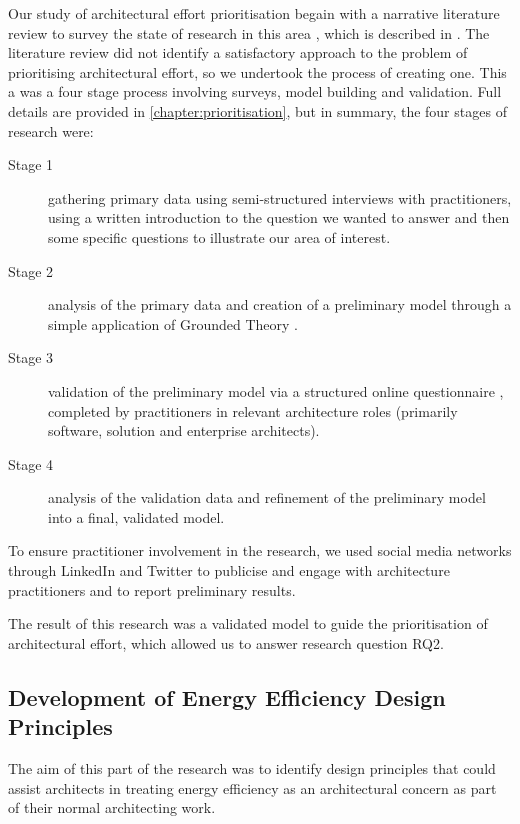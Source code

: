 Our study of architectural effort prioritisation begain with a narrative literature review to survey the state of research in this area \cite{baumeister1997-narrativereviews}, which is described in .  The literature review did not identify a satisfactory approach to the problem of prioritising architectural effort, so we undertook the process of creating one.  This a was a four stage process involving surveys, model building and validation.  Full details are provided in \cref{chapter:prioritisation}, but in summary, the four stages of research were:
\nopagebreak
\begin{description}
	\item [Stage 1] gathering primary data using semi-structured interviews with practitioners, using a written introduction to the question we wanted to answer and then some specific questions to illustrate our area of interest. 
	\item [Stage 2] analysis of the primary data and creation of a preliminary model through a simple application of Grounded Theory \cite{charmaz2006-groundedtheory}.
	\item [Stage 3] validation of the preliminary model via a structured online questionnaire \cite{gillham2000-questionnaire}, completed by practitioners in relevant architecture roles (primarily software, solution and enterprise architects).
	\item [Stage 4] analysis of the validation data and refinement of the preliminary model into a final, validated model.
\end{description}

To ensure practitioner involvement in the research, we used social media networks through LinkedIn and Twitter to publicise and engage with architecture practitioners and to report preliminary results.

The result of this research was a validated model to guide the prioritisation of architectural effort, which allowed us to answer research question RQ2.

\subsection{Development of Energy Efficiency Design Principles}

The aim of this part of the research was to identify design principles that could assist architects in treating energy efficiency as an architectural concern as part of their normal architecting work.


